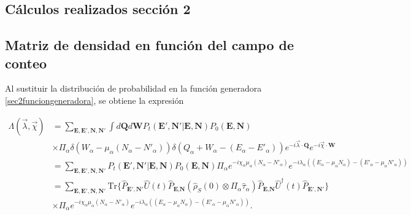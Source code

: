 \begin{appendixs}
	
	\section{Cálculos realizados sección 2}

    \subsection{Matriz de densidad en función del campo de conteo}

    \label{apendix:fcs1}
    Al sustituir la distribución de probabilidad en la función generadora \ref{sec2funciongeneradora}, se obtiene la expresión 

    \begin{align*}
        \Lambda(\vec{\lambda},\vec{\chi}) & = \sum_{\textbf{E},\textbf{E}',\textbf{N},\textbf{N}'} \int d\textbf{Q}d\textbf{W} P_{t}(\textbf{E}',\textbf{N}'|\textbf{E},\textbf{N}) P_{0}(\textbf{E},\textbf{N})  \\
        & \times \Pi_{\alpha} \delta(W_{\alpha} - \mu_{\alpha}(N_{\alpha} - N'_{\alpha}) ) \delta(Q_{\alpha} + W_{\alpha} -(E_{\alpha} - E'_{\alpha})) e^{-i\vec{\lambda}\cdot \textbf{Q}} e^{-i\vec{\chi}\cdot \textbf{W}} \\
        & = \sum_{\textbf{E},\textbf{E}',\textbf{N},\textbf{N}'}P_{t}(\textbf{E}',\textbf{N}'|\textbf{E},\textbf{N})P_{0}(\textbf{E},\textbf{N}) \Pi_{\alpha}e^{-i\chi_{\alpha}\mu_{\alpha}(N_{\alpha} - N'_{\alpha})}e^{-i\lambda_{\alpha}((E_{\alpha} -\mu_{\alpha}N_{\alpha}) - (E'_{\alpha} - \mu_{\alpha}N'_{\alpha}) ) }  \\
        & = \sum_{\textbf{E},\textbf{E}',\textbf{N},\textbf{N}'} \text{Tr}\{\hat{P}_{\textbf{E}',\textbf{N}'}\hat{U}(t)\hat{P}_{\textbf{E},\textbf{N}}(\hat{\rho}_{S}(0) \otimes \Pi_{\alpha}\hat{\tau}_{\alpha} )\hat{P}_{\textbf{E},\textbf{N}}\hat{U}^{\dagger}(t)\hat{P}_{\textbf{E}',\textbf{N}'}   \} \\
        & \times \Pi_{\alpha} e^{-i\chi_{\alpha}\mu_{\alpha}(N_{\alpha} - N'_{\alpha})}e^{-i\lambda_{\alpha}((E_{\alpha} -\mu_{\alpha}N_{\alpha}) - (E'_{\alpha} - \mu_{\alpha}N'_{\alpha}) ) }.
    \end{align*}


\end{appendixs}

